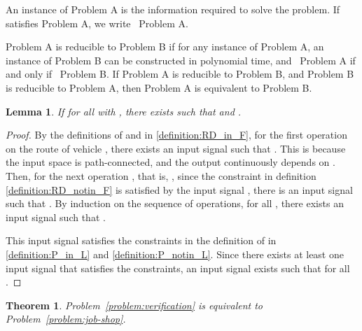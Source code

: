 \documentclass{sig-alternate}
\newtheorem{theorem}{Theorem}
\newtheorem{lemma}{Lemma}
\begin{document}
\begin{definition}\cite{cormen_introduction_2009}
	An instance  of Problem A is the information required to solve the problem. If  satisfies Problem A, we write ~Problem A. 
	
	Problem A is reducible to Problem B if for any instance  of Problem A, an instance  of Problem B can be constructed in polynomial time, and ~Problem A if and only if ~Problem B. If Problem A is reducible to Problem B, and Problem B is reducible to Problem A, then Problem A is equivalent to Problem B.
\end{definition}
\begin{lemma}\label{lemma:existence_input}
	If  for all  with , there exists  such that  and .
\end{lemma}
\begin{proof}
	By the definitions of  and  in \eqref{definition:RD_in_F}, for the first operation  on the route of vehicle , there exists an input signal  such that . This is because the input space is path-connected, and the output  continuously depends on . Then, for the next operation , that is, , since the constraint in definition \eqref{definition:RD_notin_F} is satisfied by the input signal , there is an input signal  such that . By induction on the sequence of operations, for all , there exists an input signal  such that .
	
	This input signal  satisfies the constraints in the definition of  in \eqref{definition:P_in_L} and \eqref{definition:P_notin_L}. Since there exists at least one input signal that satisfies the constraints, an input signal  exists such that  for all .
\end{proof}
\begin{theorem}\label{theorem:P1_equivalent_P3}
Problem~\ref{problem:verification} is equivalent to Problem~\ref{problem:job-shop}.
\end{theorem}
\end{document}

